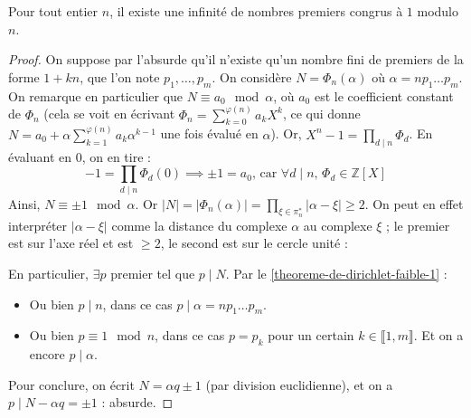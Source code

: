 	\begin{theorem}
		Pour tout entier $n$, il existe une infinité de nombres premiers congrus à $1$ modulo $n$.
	\end{theorem}

	\begin{proof}
		On suppose par l'absurde qu'il n'existe qu'un nombre fini de premiers de la forme $1+kn$, que l'on note $p_1, \dots, p_m$. On considère $N = \Phi_n(\alpha)$ où $\alpha = n p_1 \dots p_m$. On remarque en particulier que $N \equiv a_0 \mod \alpha$, où $a_0$ est le coefficient constant de $\Phi_n$ (cela se voit en écrivant $\Phi_n = \sum_{k=0}^{\varphi(n)} a_k X^k$, ce qui donne $N = a_0 + \alpha \sum_{k=1}^{\varphi(n)} a_k \alpha^{k-1}$ une fois évalué en $\alpha$).
		\newpar
		Or, $X^n - 1 = \prod_{d \mid n} \Phi_d$. En évaluant en $0$, on en tire :
		\[ -1 = \prod_{d \mid n} \Phi_d(0) \implies \pm 1 = a_0 \text{, car } \forall d \mid n, \, \Phi_d \in \mathbb{Z}[X] \]
		Ainsi, $N \equiv \pm 1 \mod \alpha$. Or $|N| = |\Phi_n(\alpha)| = \prod_{\xi \in \pi_n^*} |\alpha - \xi| \geq 2$. On peut en effet interpréter $|\alpha - \xi|$ comme la distance du complexe $\alpha$ au complexe $\xi$ ; le premier est sur l'axe réel et est $\geq 2$, le second est sur le cercle unité :
		\begin{center}
		\end{center}
		En particulier, $\exists p$ premier tel que $p \mid N$. Par le \cref{theoreme-de-dirichlet-faible-1} :
		\begin{itemize}
			\item Ou bien $p \mid n$, dans ce cas $p \mid \alpha = n p_1 \dots p_m$.
			\item Ou bien $p \equiv 1 \mod n$, dans ce cas $p = p_k$ pour un certain $k \in \llbracket 1, m \rrbracket$. Et on a encore $p \mid \alpha$.
		\end{itemize}
		Pour conclure, on écrit $N = \alpha q \pm 1$ (par division euclidienne), et on a $p \mid N - \alpha q = \pm 1$ : absurde.
	\end{proof}

